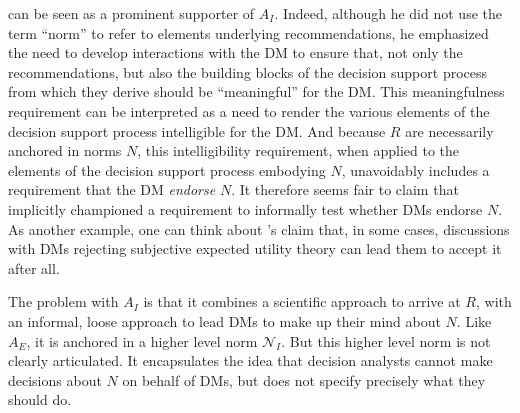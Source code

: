 \documentclass[preprint, french, english, 11pt, authoryear]{elsarticle}%
\newcommand{\ac}[1]{#1}
\newcommand{\acp}[1]{#1s}
\begin{document}
\citet{roy_multicriteria_1996} can be seen as a prominent supporter of $A_I$. 
Indeed, although he did not use the term “norm” to refer to elements underlying recommendations, he emphasized the need to develop interactions with the \ac{DM} to ensure that, not only the recommendations, 
but also the building blocks of the decision support process from which they derive should be ``meaningful'' for the \ac{DM}.
This meaningfulness requirement can be interpreted as a need to render the various elements of the decision support process intelligible for the \ac{DM}.
And because $R$ are necessarily anchored in norms $N$, this intelligibility requirement, when applied to the elements of the decision support process embodying $N$, unavoidably includes a requirement that the \ac{DM} \emph{endorse} $N$. 
It therefore seems fair to claim that \citet{roy_multicriteria_1996} implicitly championed a requirement to informally test whether \acp{DM} endorse $N$. 
As another example, one can think about \citet{raiffa_back_1985}’s claim that, in some cases, discussions with \acp{DM} rejecting subjective expected utility theory can lead them to accept it after all.

The problem with $A_I$ is that it combines a scientific approach to arrive at $R$, with an informal, loose approach to lead \acp{DM} to make up their mind about $N$.
Like $A_E$, it is anchored in a higher level norm $\mathscr{N}_I$. But this higher level norm is not clearly articulated. It encapsulates the idea that decision analysts cannot make decisions about $N$ on behalf of \acp{DM}, but does not specify precisely what they should do.
\end{document}

